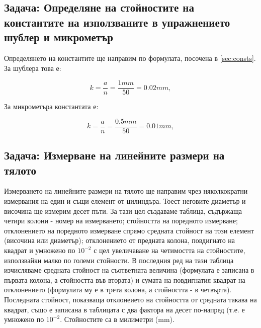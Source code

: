 \documentclass[12pt]{article}
\begin{document}
\subsection{Задача: Определяне на стойностите на константите на използваните в упражнението шублер и микрометър}\label{sec:consts_of_instruments}
Определянето на константите ще направим по формулата, посочена в \ref{sec:consts}. За шублера това е: 

\begin{displaymath}
k = \frac{a}{n} = \frac{1mm}{50} = 0.02 mm,
\end{displaymath}

За микрометъра константата е:

\begin{displaymath}
k = \frac{a}{n} = \frac{0.5mm}{50} = 0.01 mm,
\end{displaymath}

\subsection{Задача: Измерване на линейните размери на тялото}\label{sec:measurements}
Измерването на линейните размери на тялото ще направим чрез няколкократни измервания на един и същи елемент от цилиндъра. Тоест неговите диаметър и височина ще измерим десет пъти. За тази цел създаваме таблица, съдържаща четири колони - номер на измерването; стойността на поредното измерване; отклонението на поредното измерване спрямо средната стойност на този елемент (височина или диаметър); отклонението от предната колона, повдигнато на квадрат и умножено по \begin{math} 10^{-2} \end{math} с цел увеличаване на четимостта на стойностите, използвайки малко по големи стойности. В последния ред на тази таблица изчисляваме средната стойност на съответната величина (формулата е записана в първата колона, а стойността във втората) и сумата на повдигнатия квадрат на отклонението (формулата му е в трета колона, а стойността - в четвърта). Последната стойност, показваща отклонеието на стойността от средната такава на квадрат, също е записана в таблицата с два фактора на десет по-напред (т.е. е умножено по \begin{math}10^{-2}\end{math}. Стойностите са в милиметри (mm).
\end{document}
